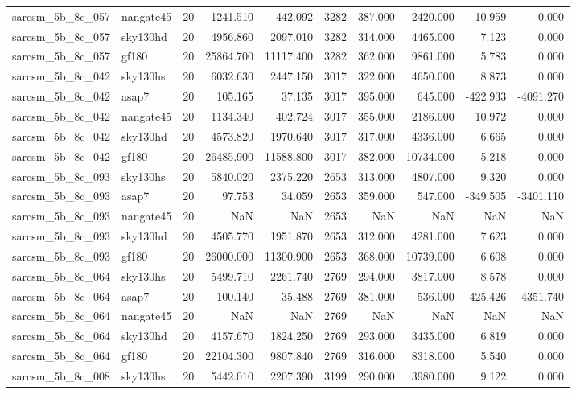 \begin{longtable}{llrrrrrrrr}
sarcsm\_5b\_8c\_057 & nangate45 & 20 & 1241.510 & 442.092 & 3282 & 387.000 & 2420.000 & 10.959 & 0.000 \\
sarcsm\_5b\_8c\_057 & sky130hd & 20 & 4956.860 & 2097.010 & 3282 & 314.000 & 4465.000 & 7.123 & 0.000 \\
sarcsm\_5b\_8c\_057 & gf180 & 20 & 25864.700 & 11117.400 & 3282 & 362.000 & 9861.000 & 5.783 & 0.000 \\
sarcsm\_5b\_8c\_042 & sky130hs & 20 & 6032.630 & 2447.150 & 3017 & 322.000 & 4650.000 & 8.873 & 0.000 \\
sarcsm\_5b\_8c\_042 & asap7 & 20 & 105.165 & 37.135 & 3017 & 395.000 & 645.000 & -422.933 & -4091.270 \\
sarcsm\_5b\_8c\_042 & nangate45 & 20 & 1134.340 & 402.724 & 3017 & 355.000 & 2186.000 & 10.972 & 0.000 \\
sarcsm\_5b\_8c\_042 & sky130hd & 20 & 4573.820 & 1970.640 & 3017 & 317.000 & 4336.000 & 6.665 & 0.000 \\
sarcsm\_5b\_8c\_042 & gf180 & 20 & 26485.900 & 11588.800 & 3017 & 382.000 & 10734.000 & 5.218 & 0.000 \\
sarcsm\_5b\_8c\_093 & sky130hs & 20 & 5840.020 & 2375.220 & 2653 & 313.000 & 4807.000 & 9.320 & 0.000 \\
sarcsm\_5b\_8c\_093 & asap7 & 20 & 97.753 & 34.059 & 2653 & 359.000 & 547.000 & -349.505 & -3401.110 \\
sarcsm\_5b\_8c\_093 & nangate45 & 20 & NaN & NaN & 2653 & NaN & NaN & NaN & NaN \\
sarcsm\_5b\_8c\_093 & sky130hd & 20 & 4505.770 & 1951.870 & 2653 & 312.000 & 4281.000 & 7.623 & 0.000 \\
sarcsm\_5b\_8c\_093 & gf180 & 20 & 26000.000 & 11300.900 & 2653 & 368.000 & 10739.000 & 6.608 & 0.000 \\
sarcsm\_5b\_8c\_064 & sky130hs & 20 & 5499.710 & 2261.740 & 2769 & 294.000 & 3817.000 & 8.578 & 0.000 \\
sarcsm\_5b\_8c\_064 & asap7 & 20 & 100.140 & 35.488 & 2769 & 381.000 & 536.000 & -425.426 & -4351.740 \\
sarcsm\_5b\_8c\_064 & nangate45 & 20 & NaN & NaN & 2769 & NaN & NaN & NaN & NaN \\
sarcsm\_5b\_8c\_064 & sky130hd & 20 & 4157.670 & 1824.250 & 2769 & 293.000 & 3435.000 & 6.819 & 0.000 \\
sarcsm\_5b\_8c\_064 & gf180 & 20 & 22104.300 & 9807.840 & 2769 & 316.000 & 8318.000 & 5.540 & 0.000 \\
sarcsm\_5b\_8c\_008 & sky130hs & 20 & 5442.010 & 2207.390 & 3199 & 290.000 & 3980.000 & 9.122 & 0.000 \\

\end{longtable}
